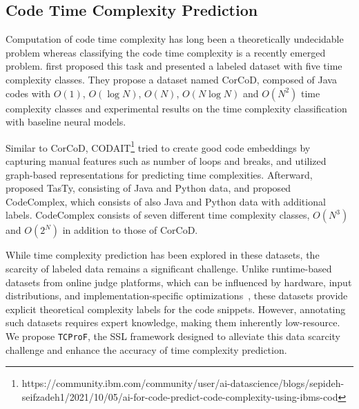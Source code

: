 \subsection{Code Time Complexity Prediction}
Computation of code time complexity has long been a theoretically undecidable problem
whereas classifying the code time complexity is a recently emerged problem.
\citet{SikkaSKUSZ20} first proposed this task and presented a labeled dataset with
five time complexity classes.
They propose a dataset named CorCoD,
composed of Java codes with $O(1)$, $O(\log N)$, $O(N)$, $O(N\log N)$ and $O(N^2)$ time complexity classes
and experimental results on the time complexity classification with baseline neural models.

Similar to CorCoD,
CODAIT\footnote{https://community.ibm.com/community/user/ai-datascience/blogs/sepideh-seifzadeh1/2021/10/05/ai-for-code-predict-code-complexity-using-ibms-cod}
tried to create good code embeddings by capturing manual features such 
as number of loops and breaks, and utilized graph-based representations
for predicting time complexities.
Afterward, \citet{MoudgalyaRCL23} proposed TasTy, consisting of Java and Python data, and \citet{BaikJHKHK24}
proposed CodeComplex, which consists of also Java and Python data with additional labels.
CodeComplex consists of seven different time complexity classes,
$O(N^3)$ and $O(2^N)$ in addition to those of CorCoD.

While time complexity prediction has been explored in these datasets,
the scarcity of labeled data remains a significant challenge.
Unlike runtime-based datasets from online judge platforms,
which can be influenced by hardware, input distributions,
and implementation-specific optimizations~\cite{IshimweNN21,ZhangWL23},
these datasets provide explicit theoretical complexity labels for the code snippets.
However, annotating such datasets requires expert knowledge, making them inherently low-resource.
We propose \texttt{TCProF}, the SSL framework designed to
alleviate this data scarcity challenge and enhance the accuracy of time complexity prediction.
